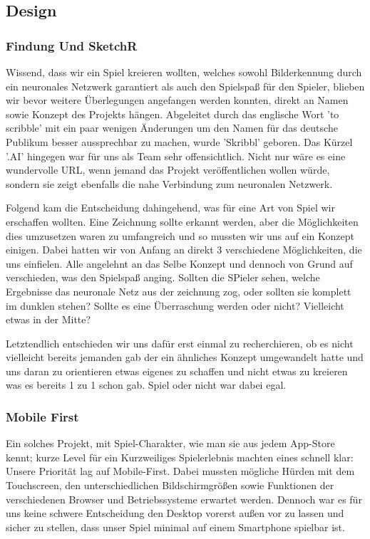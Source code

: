 \documentclass[11pt]{article}
\begin{document}
\subsection{Design}
\subsubsection{Findung Und SketchR}

Wissend, dass wir ein Spiel kreieren wollten, welches sowohl Bilderkennung durch ein neuronales Netzwerk garantiert als auch den Spielspaß für den Spieler, blieben wir bevor weitere Überlegungen angefangen werden konnten, direkt an Namen sowie Konzept des Projekts hängen.
Abgeleitet durch das englische Wort 'to scribble' mit ein paar wenigen Änderungen um den Namen für das deutsche Publikum besser aussprechbar zu machen, wurde 'Skribbl' geboren. Das Kürzel '.AI' hingegen war für uns als Team sehr offensichtlich. Nicht nur wäre es eine wundervolle URL, wenn jemand das Projekt veröffentlichen wollen würde, sondern sie zeigt ebenfalls die nahe Verbindung zum neuronalen Netzwerk.

Folgend kam die Entscheidung dahingehend, was für eine Art von Spiel wir erschaffen wollten. Eine Zeichnung sollte erkannt werden, aber die Möglichkeiten dies umzusetzen waren zu umfangreich und so mussten wir uns auf ein Konzept einigen. Dabei hatten wir von Anfang an direkt 3 verschiedene Möglichkeiten, die uns einfielen. Alle angelehnt an das Selbe Konzept und dennoch von Grund auf verschieden, was den Spielspaß anging. Sollten die SPieler sehen, welche Ergebnisse das neuronale Netz aus der zeichnung zog, oder sollten sie komplett im dunklen stehen? Sollte es eine Überraschung werden oder nicht? Vielleicht etwas in der Mitte?

Letztendlich entschieden wir uns dafür erst einmal zu recherchieren, ob es nicht vielleicht bereits jemanden gab der ein ähnliches Konzept umgewandelt hatte und uns daran zu orientieren etwas eigenes zu schaffen und nicht etwas zu kreieren was es bereits 1 zu 1 schon gab. Spiel oder nicht war dabei egal.

\subsubsection{Mobile First}

Ein solches Projekt, mit Spiel-Charakter, wie man sie aus jedem App-Store kennt; kurze Level für ein Kurzweiliges Spielerlebnis machten eines schnell klar: Unsere Priorität lag auf Mobile-First.
Dabei mussten mögliche Hürden mit dem Touchscreen, den unterschiedlichen Bildschirmgrößen sowie Funktionen der verschiedenen Browser und Betriebssysteme erwartet werden. Dennoch war es für uns keine schwere Entscheidung den Desktop vorerst außen vor zu lassen und sicher zu stellen, dass unser Spiel minimal auf einem Smartphone spielbar ist.
\end{document}
